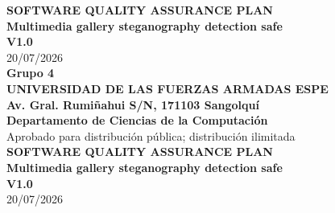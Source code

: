 ﻿\begin{titlepage}
    \centering
    {\Huge \textbf{SOFTWARE QUALITY ASSURANCE PLAN}}\\
    \vspace{0.2cm}
    {\Huge \textbf{Multimedia gallery steganography detection safe}}\\
    \vspace{0.5cm}
    {\Large \textbf{V1.0}}\\
    \vspace{0.3cm}
    {\Large 20/07/2026}\\
    \vspace*{13cm}
    { \textbf{Grupo 4}}\\
    { \textbf{UNIVERSIDAD DE LAS FUERZAS ARMADAS ESPE}}\\
    \vspace{0.2cm}
    { \textbf{Av. Gral. Rumiñahui S/N, 171103 Sangolquí}}\\
    {  \textbf{Departamento de Ciencias de la Computación}}\\
    \vspace{0.2cm}
    \vspace{0.2cm}
    { Aprobado para distribución pública; distribución ilimitada}\\
    \vspace{2cm}
    \newpage
    {\Huge \textbf{SOFTWARE QUALITY ASSURANCE PLAN}}\\
    \vspace{0.2cm}
    {\Huge \textbf{Multimedia gallery steganography detection safe}}\\
    \vspace{0.5cm}
    {\Large \textbf{V1.0}}\\
    \vspace{0.5cm}
    {\Large 20/07/2026}\\
    \vspace{0.5cm}
    \vspace{0.5cm}
    \vspace{2cm}
    
    
    

\end{titlepage}

